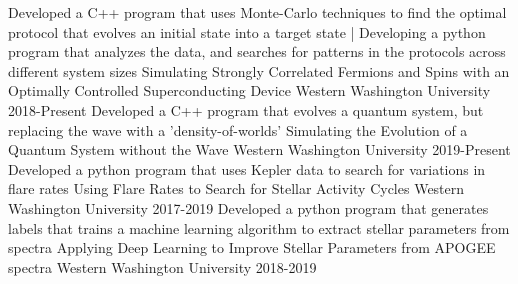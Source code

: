

\begin{cventries}
\cventry
    {Developed a C++ program that uses Monte-Carlo techniques to find the optimal protocol that evolves an initial state into a target state | Developing a python program that analyzes the data, and searches for patterns in the protocols across different system sizes}
    {Simulating Strongly Correlated Fermions and Spins with an Optimally Controlled  Superconducting Device}
    {Western Washington University}
    {2018-Present}{}
    \vspace{-0.3cm}
\cventry
    {Developed a C++ program that evolves a quantum system, but replacing the wave with a 'density-of-worlds'}
    {Simulating the Evolution of a Quantum System without the Wave}
    {Western Washington University}
    {2019-Present}{}
    \vspace{-0.3cm}
\cventry
    {Developed a python program that uses Kepler data to search for variations in flare rates}
    {Using Flare Rates to Search for Stellar Activity Cycles}
    {Western Washington University}
    {2017-2019}{}
    \vspace{-0.3cm}
\cventry
    {Developed a python program that generates labels that trains a machine learning algorithm to extract stellar parameters from spectra}
    {Applying Deep Learning to Improve Stellar Parameters from APOGEE spectra}
    {Western Washington University}
    {2018-2019}{}
    \vspace{-0.3cm}



\end{cventries}


